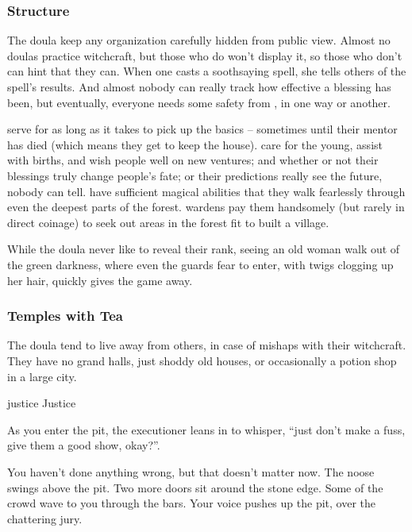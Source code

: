 \begin{multicols}{2}
\subsubsection{Structure}
The doula keep any organization carefully hidden from public view.
Almost no \glspl{doula} practice witchcraft, but those who do won't display it, so those who don't can hint that they can.
When one casts a soothsaying spell, she tells others of the spell's results.
And almost nobody can really track how effective a blessing has been, but eventually, everyone needs some safety from \hphantom{Nulla}, in one way or another.

\begin{description}
  serve for as long as it takes to pick up the basics -- sometimes until their mentor has died (which means they get to keep the house).
  care for the young, assist with births, and wish people well on new ventures; and whether or not their blessings truly change people's fate; or their predictions really see the future, nobody can tell.
  have sufficient magical abilities that they walk fearlessly through even the deepest parts of the forest.
  \Glspl{warden} pay them handsomely (but rarely in direct coinage) to seek out areas in the forest fit to built a \gls{village}.

  While the doula never like to reveal their rank, seeing an old woman walk out of the green darkness, where even the \glspl{guard} fear to enter, with twigs clogging up her hair, quickly gives the game away.
\end{description}

\subsubsection{Temples with Tea}
The doula tend to live away from others, in case of mishaps with their witchcraft.
They have no grand halls, just shoddy old houses, or occasionally a potion shop in a large city.

  {\gls{justice}}%
  {Justice}%
  {
    As you enter the pit, the executioner leans in to whisper, ``just don't make a fuss, give them a good show, okay?''.

    You haven't done anything wrong, but that doesn't matter now.
    The noose swings above the pit.
    Two more doors sit around the stone edge.
    Some of the crowd wave to you through the bars.
    Your voice pushes up the pit, over the chattering jury.

}
\end{multicols}
